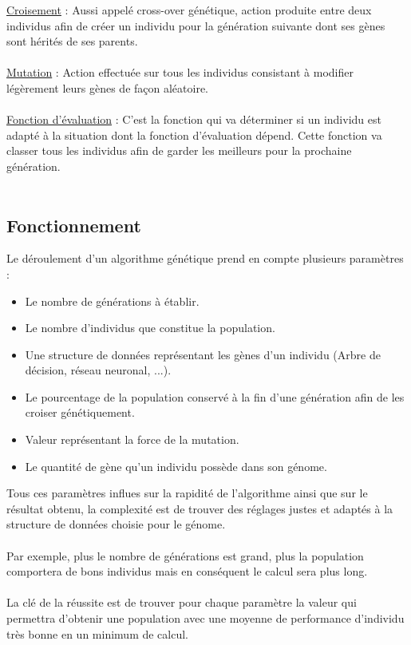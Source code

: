 \documentclass[12pt]{report}
\begin{document}
	\underline{Croisement} : Aussi appelé cross-over génétique, action produite entre deux individus afin de créer un individu pour la génération suivante dont ses gènes sont hérités de ses parents.\\\\
	\newpage
	\underline{Mutation} : Action effectuée sur tous les individus consistant à modifier légèrement leurs gènes de façon aléatoire.\\\\
	\underline{Fonction d'évaluation} : C'est la fonction qui va déterminer si un individu est adapté à la situation dont la fonction d'évaluation dépend. Cette fonction va classer tous les individus afin de garder les meilleurs pour la prochaine génération.\\\\
	\subsection{Fonctionnement}
	Le déroulement d'un algorithme génétique prend en compte plusieurs paramètres :
	\begin{itemize}
		\item Le nombre de générations à établir.
		\item Le nombre d'individus que constitue la population.
		\item Une structure de données représentant les gènes d'un individu (Arbre de décision, réseau neuronal, ...).
		\item Le pourcentage de la population conservé à la fin d'une génération afin de les croiser génétiquement.
		\item Valeur représentant la force de la mutation.
		\item Le quantité de gène qu'un individu possède dans son génome.
	\end{itemize}
	Tous ces paramètres influes sur la rapidité de l'algorithme ainsi que sur le résultat obtenu, 
	la complexité est de trouver des réglages justes et adaptés à la structure de données choisie pour le génome.\\\\
	Par exemple, plus le nombre de générations est grand, plus la population comportera de bons individus mais en conséquent le calcul sera plus long.\\\\
	La clé de la réussite est de trouver pour chaque paramètre la valeur qui permettra d'obtenir une population avec une moyenne de performance d'individu très bonne en un minimum de calcul.
\end{document}
